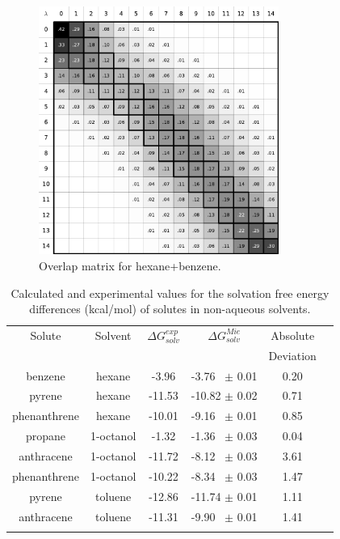 \begin{figure}[h]
	\centering
	\includegraphics[width=0.7\textwidth]{Figures/ohex_benz}
	\caption{Overlap matrix for hexane+benzene.}
	\label{fig:hexove}
\end{figure}
\FloatBarrier
\begin{table}[h]
	\centering
	\caption{Calculated and experimental values for the solvation free energy differences (kcal/mol) of solutes in non-aqueous solvents.}
	\label{tbl:solv1}
	\begin{tabular}{cccccc}
		\hline\hline
		Solute       & Solvent   & $\Delta G_{solv}^{exp}$ & $\Delta G_{solv}^{Mie}$ & Absolute  &  \\
		&           &                         &                         & Deviation &  \\ \hline\hline
		benzene      & hexane    & -3.96                   & -3.76  $\,$ $\pm$ 0.01       & 0.20      &  \\
		pyrene       & hexane    & -11.53                  & -10.82 $\pm$ 0.02       & 0.71      &  \\
		phenanthrene & hexane    & -10.01                  & -9.16  $\,$ $\pm$ 0.01       & 0.85      &  \\
		propane      & 1-octanol & -1.32                   & -1.36  $\,$ $\pm$ 0.03       & 0.04      &  \\
		anthracene   & 1-octanol & -11.72                  & -8.12   $\,$ $\pm$ 0.03       & 3.61      &  \\
		phenanthrene & 1-octanol & -10.22                  & -8.34  $\,$ $\pm$ 0.03       & 1.47      &  \\
		pyrene       & toluene   & -12.86                  & -11.74 $\pm$ 0.01       & 1.11      &  \\
		anthracene   & toluene   & -11.31                  & -9.90 $\,$ $\pm$ 0.01        & 1.41      &  \\ \hline\hline
		&
	\end{tabular}
\end{table}


